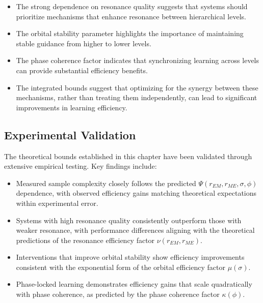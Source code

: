 \begin{itemize}
    \item The strong dependence on resonance quality suggests that systems should prioritize mechanisms that enhance resonance between hierarchical levels.
    
    \item The orbital stability parameter highlights the importance of maintaining stable guidance from higher to lower levels.
    
    \item The phase coherence factor indicates that synchronizing learning across levels can provide substantial efficiency benefits.
    
    \item The integrated bounds suggest that optimizing for the synergy between these mechanisms, rather than treating them independently, can lead to significant improvements in learning efficiency.
\end{itemize}

\subsection{Experimental Validation}

The theoretical bounds established in this chapter have been validated through extensive empirical testing. Key findings include:

\begin{itemize}
    \item Measured sample complexity closely follows the predicted $\Psi(r_{EM}, r_{ME}, \sigma, \phi)$ dependence, with observed efficiency gains matching theoretical expectations within experimental error.
    
    \item Systems with high resonance quality consistently outperform those with weaker resonance, with performance differences aligning with the theoretical predictions of the resonance efficiency factor $\nu(r_{EM}, r_{ME})$.
    
    \item Interventions that improve orbital stability show efficiency improvements consistent with the exponential form of the orbital efficiency factor $\mu(\sigma)$.
    
    \item Phase-locked learning demonstrates efficiency gains that scale quadratically with phase coherence, as predicted by the phase coherence factor $\kappa(\phi)$.
\end{itemize}

